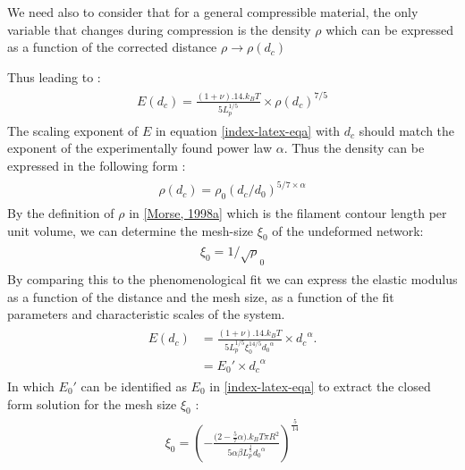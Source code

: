 \documentclass[A4paperpaper,11pt,english]{sphinxmanual}
\begin{document}
We need also to consider that for a general compressible material, the
only variable that changes during compression is the density \(\rho\)
which can be expressed as a function of the corrected distance \(\rho \to
\rho(d_c)\)

Thus leading to :
\label{index-latex:equation-eqa}\begin{gather}
\begin{split}E(d_c)=\frac{ (1+\nu).14.k_BT}{5L_p^{1/5}}\times \rho(d_c)^{7/5}\end{split}\label{index-latex-eqa}
\end{gather}
The scaling exponent of \(E\) in equation \eqref{index-latex-eqa} with \(d_c\) should match the exponent
of the experimentally found power law \(\alpha\). Thus the density can be
expressed in the following form :
\label{index-latex:equation-eq-rho}\begin{gather}
\begin{split}\rho(d_c)=\rho_0(d_c/d_0)^{5/7\times\alpha}\end{split}\label{index-latex-eq-rho}
\end{gather}
By the definition of \(\rho\) in {\hyperref[index-latex:morse1998a]{{[}Morse,  1998a{]}}} which is
the filament contour length per unit volume, we can determine the
mesh-size \(\xi_0\) of the undeformed network:
\label{index-latex:equation-eqa38}\begin{gather}
\begin{split}\xi_0 = 1/\sqrt\rho_0\end{split}\label{index-latex-eqa38}
\end{gather}
By comparing this to the phenomenological fit we can express the elastic
modulus as a function of the distance and the mesh size, as a function of the
fit parameters and characteristic scales of the system.
\label{index-latex:equation-eqb}\begin{gather}
\begin{split}E(d_c)     &=  \frac{(1+\nu).14.k_BT}{5L_p^{1/5}\xi_0^{14/5} \left.d_0\right.^{\alpha}}\times \left.d_c\right.^{\alpha}.\\
                &=  E_0' \times \left.d_c\right.^{\alpha}\end{split}\label{index-latex-eqb}
\end{gather}
In which \(E_0'\) can be identified as \(E_0\) in \eqref{index-latex-eqa} to extract the
closed form solution for the mesh size \(\xi_0\) :
\label{index-latex:equation-eqa39}\begin{gather}
\begin{split}\xi_0=\left(-\frac{({2-\frac{5}{7}\alpha)}.k_BT\pi R^2}{5\alpha \beta L_p^{\frac{1}{5}}\left.d_0\right.^{\alpha}}\right)^{\frac{5}{14}}\end{split}\label{index-latex-eqa39}
\end{gather}
\end{document}
